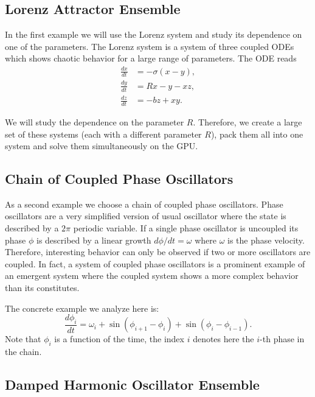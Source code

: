 \documentclass[1p]{elsarticle}
\begin{document}
\subsection{Lorenz Attractor Ensemble}

In the first example we will use the Lorenz system and study its dependence on
one of the parameters. The Lorenz system is a system of three coupled ODEs
which shows chaotic behavior for a large range of parameters. The ODE reads
\begin{align}
    \frac{dx}{dt} &= -\sigma \left( x - y \right), \\
    \frac{dy}{dt} &= R x - y - xz, \\
    \frac{dz}{dt} &= -bz + xy.
\end{align}

We will study the dependence on the parameter $R$. Therefore, we create a large
set of these systems (each with a different parameter $R$), pack them all into
one system and solve them simultaneously on the GPU.

\subsection{Chain of Coupled Phase Oscillators}

As a second example we choose a chain of coupled phase oscillators. Phase
oscillators are a very simplified version of usual oscillator where the state
is described by a $2\pi$ periodic variable. If a single phase oscillator is
uncoupled its phase $\phi$ is described by a linear growth $d\phi/dt = \omega$
where $\omega$ is the phase velocity. Therefore, interesting behavior can only
be observed if two or more oscillators are coupled. In fact, a system of
coupled phase oscillators is a prominent example of an emergent system where
the coupled system shows a more complex behavior than its constitutes.

The concrete example we analyze here is:
\begin{equation}
    \frac{d\phi_i}{dt} = \omega_i + \sin( \phi_{i+1} - \phi_i) + \sin( \phi_i
    - \phi_{i-1}).
\end{equation}
Note that $\phi_i$ is a function of the time, the index $i$ denotes here the
$i$-th phase in the chain.

\subsection{Damped Harmonic Oscillator Ensemble}
\end{document}
